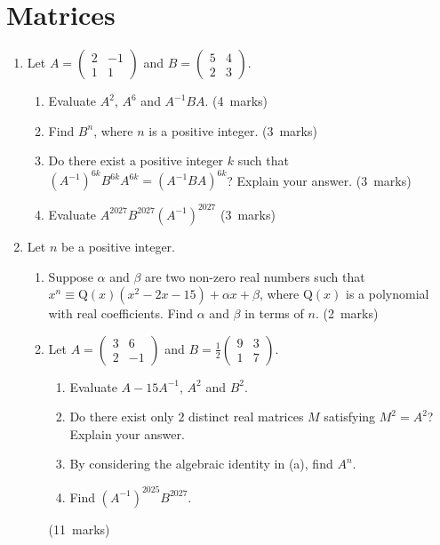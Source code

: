 \documentclass[12pt, a4paper]{article} %
\newcommand{\qmarks}[1]{\leavevmode\unskip\hspace*{\fill}\mbox{(#1 marks)}}
\begin{document}
\section{Matrices}
\begin{enumerate}
    \item Let \(\displaystyle A=
    \begin{pmatrix}
        2&-1\\
        1&1
    \end{pmatrix}\) and \(\displaystyle B=
    \begin{pmatrix}
        5&4\\
        2&3
    \end{pmatrix}\).
    \begin{enumerate}
        \item Evaluate \(A^2\), \(A^6\) and \(A^{-1}BA\).   \qmarks{4}
        \item Find \(B^n\), where \(n\) is a positive integer. \qmarks{3}
        \item Do there exist a positive integer \(k\) such that \((A^{-1})^{6k}B^{6k}A^{6k}=(A^{-1}BA)^{6k}\)? Explain your answer. \qmarks{3}
        \item Evaluate \(A^{2027}B^{2027}(A^{-1})^{2027}\) \qmarks{3}
    \end{enumerate}

    \item Let \(n\) be a positive integer.
    \begin{enumerate}
        \item Suppose \(\alpha\) and \(\beta\) are two non-zero real numbers such that \\
        \(x^n \equiv \mathrm{Q}(x)(x^2-2x-15)+\alpha x+\beta\), where \(\mathrm{Q}(x)\) is a polynomial with real coefficients. Find \(\alpha\) and \(\beta\) in terms of \(n\).    \qmarks{2}
        \item Let \(A=\begin{pmatrix}
            3&6\\
            2&-1
        \end{pmatrix}\) and \(\displaystyle B=\frac{1}{2}\begin{pmatrix}
            9&3\\1&7
        \end{pmatrix}\).
        \begin{enumerate}[label=(\roman*)]
            \item Evaluate \(A-15A^{-1}\), \(A^2\) and \(B^2\).
            \item Do there exist only \(2\) distinct real matrices \(M\) satisfying \(M^2=A^2\)? Explain your answer.
            \item By considering the algebraic identity in (a), find \(A^n\). 
            \item Find \((A^{-1})^{2025}B^{2027}\).
        \end{enumerate}\qmarks{11}
    \end{enumerate}


\end{enumerate}
\end{document}
